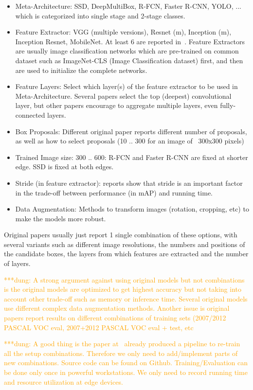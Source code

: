 \documentclass[conference]{IEEEtran}
\newcommand{\dungnote}[1]{ {\textcolor{orange} { ***dung: #1 }}}
\newcommand{\dungnote}[1]{}
\begin{document}
\begin{itemize}
    \item Meta-Architecture: SSD, DeepMultiBox, R-FCN, Faster R-CNN, YOLO, ... which is categorized into single stage and 2-stage classes.
    \item Feature Extractor: VGG (multiple versions), Resnet (m), Inception (m), Inception Resnet, MobileNet. At least 6 are reported in~\cite{huang2017speed}. Feature Extractors are usually image classification networks which are pre-trained on common dataset such as ImageNet-CLS (Image Classification dataset) first, and then are used to initialize the complete networks. 
    \item Feature Layers: Select which layer(s) of the feature extractor to be used in Meta-Architecture. Several papers select the top (deepest) convolutional layer, but other papers encourage to aggregate multiple layers, even fully-connected layers.
    \item Box Proposals: Different original paper reports different number of proposals, as well as how to select proposals (10 .. 300 for an image of ~300x300 pixels)
    \item Trained Image size: 300 .. 600: R-FCN and Faster R-CNN are fixed at shorter edge. SSD is fixed at both edges.
    \item Stride (in feature extractor): reports show that stride is an important factor in the trade-off between performance (in mAP) and running time.
    \item Data Augmentation: Methods to transform images (rotation, cropping, etc) to make the models more robust.
\end{itemize}

Original papers usually just report 1 single combination of these options, with several variants such as different image resolutions, the numbers and positions of the candidate boxes, the layers from which features are extracted and the number of layers.

\dungnote{A strong argument against using original models but not combinations is the original models are optimized to get highest accuracy but not taking into account other trade-off such as memory or inference time. Several original models use different complex data augmentation methods. Another issue is original papers report results on different combinations of training sets (2007/2012 PASCAL VOC eval, 2007+2012 PASCAL VOC eval + test, etc}

\dungnote{A good thing is the paper at~\cite{huang2017speed} already produced a pipeline to re-train all the setup combinations. Therefore we only need to add/implement parts of new combinations. Source code can be found on Github. Training/Evaluation can be done only once in powerful workstations. We only need to record running time and resource utilization at edge devices.}
\end{document}
